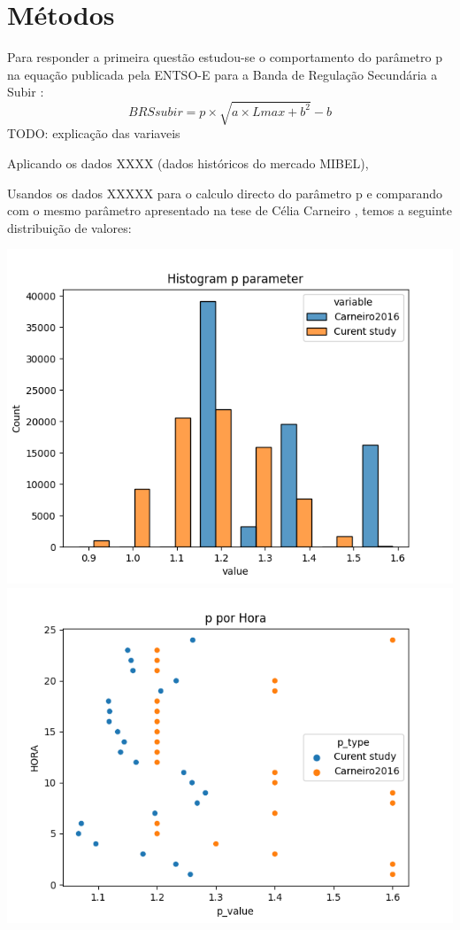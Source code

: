 \chapter{Métodos}

Para responder a primeira questão estudou-se o comportamento do parâmetro p na equação publicada pela ENTSO-E para a Banda de Regulação Secundária a Subir \cite{CMVM2018}:
\begin{equation}
\label{eq:eq_entso-e}
    BRSsubir = p \times \sqrt{a \times Lmax + b^2} - b 
\end{equation}
TODO: explicação das variaveis

Aplicando os dados XXXX (dados históricos do mercado MIBEL), 

Usandos os dados XXXXX para o calculo directo do parâmetro p e comparando com o mesmo parâmetro apresentado na tese de Célia Carneiro \cite{Carneiro2016}, temos a seguinte distribuição de valores:

\includegraphics{Imagens/Histogram p parameter.png}
\includegraphics{Imagens/p por Hora.png}

